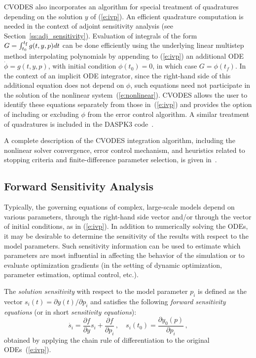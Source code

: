CVODES also incorporates an algorithm for special treatment of
quadratures depending on the solution $y$ of (\ref{e:ivp}).
An efficient quadrature computation is needed in the context of
adjoint sensitivity analysis (see Section~\ref{ss:adj_sensitivity}).
Evaluation of integrals of the form
$G = \int_{t_0}^{t_\mb{f}} g(t,y,p) dt$ can be done efficiently using the
underlying linear multistep method interpolating polynomials by
appending to (\ref{e:ivp}) an additional ODE
$\dot\phi = g(t,y,p)$, with initial condition $\phi(t_0) = 0$,
in which case $G = \phi(t_f)$. In the context of an implicit ODE
integrator, since the right-hand side of this additional equation does not
depend on $\phi$, such equations need not participate in the solution of
the nonlinear system~(\ref{e:nonlinear}). CVODES allows the user to
identify these equations separately from those in~(\ref{e:ivp}) and
provides the option of including or excluding $\phi$ from the error
control algorithm.
A similar treatment of quadratures is included in the DASPK3
code~\cite{LiPe:00,LiPe:04}.


A complete description of the CVODES integration algorithm, including 
the nonlinear solver convergence, error control mechanism, and heuristics 
related to stopping criteria and finite-difference parameter selection, is
given in~\cite{HBGLSSW:04}.


\subsection{Forward Sensitivity Analysis}\label{ss:fwd_sensitivity}

Typically, the governing equations of complex, large-scale models
depend on various parameters,  through the right-hand side vector 
and/or through the vector of initial conditions, as in (\ref{e:ivp}).
In addition to numerically solving the ODEs, it may be desirable to
determine the sensitivity of the results with respect to the model
parameters. 
Such sensitivity information can be used to estimate which
parameters are most influential in affecting the behavior of the
simulation or to evaluate optimization gradients (in the setting of dynamic
optimization, parameter estimation, optimal control, etc.).

The {\em solution sensitivity} with respect to the model parameter
$p_i$ is defined as the vector 
$s_i (t) = {\partial y(t)}/{\partial p_i}$
and satisfies the following {\em forward sensitivity equations}
(or in short {\em sensitivity equations}):
\begin{equation}\label{e:sens_eqns}
\dot{s_i}  = \frac{\partial f}{\partial y} s_i + \frac{\partial f}{\partial p_i} \, ,
\quad s_i(t_0)  = \frac{\partial y_{0}(p)}{\partial p_i} \, ,
\end{equation}
obtained by applying the chain rule of differentiation to the original
ODEs~(\ref{e:ivp}). 

